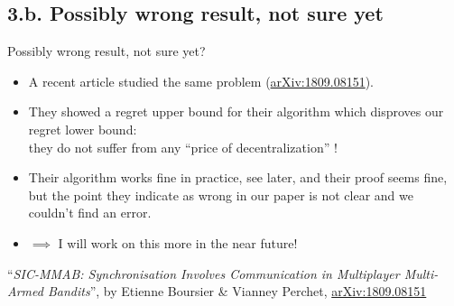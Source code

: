 \subsection{\hfill{}3.b. Possibly wrong result, not sure yet\hfill{}}

\begin{frame}{\alert{Possibly wrong result, not sure yet?}}

\begin{itemize}\tightlist
\item
A recent article studied the same problem (\textcolor{blue}{\href{https://arxiv.org/abs/1809.08151}{arXiv:1809.08151}}).

\pause

\item
They showed a regret upper bound for their \SICMMAB{} algorithm which disproves our regret lower bound:\\
they do not suffer from any ``price of decentralization'' {\Sadey} !


\pause
\vspace*{15pt}

\item
Their algorithm works fine in practice, see later,
and their proof seems fine, but the point they indicate as wrong in our paper is not clear and we couldn't find an error.

\item
$\implies$ I will work on this more in the near future!
\end{itemize}

\vfill{}
\begin{footnotesize}
  ``\emph{SIC-MMAB: Synchronisation Involves Communication in Multiplayer Multi-Armed Bandits}'',
  by Etienne Boursier \& Vianney Perchet,
  \textcolor{blue}{\href{https://arxiv.org/abs/1809.08151}{arXiv:1809.08151}}
\end{footnotesize}

\end{frame}



